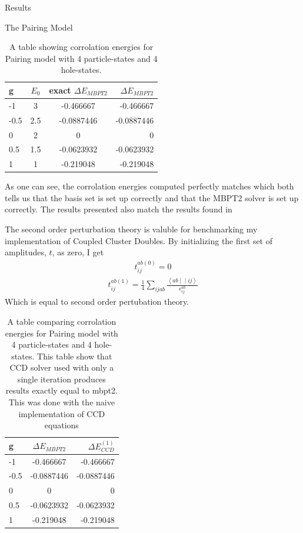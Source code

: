 \documentclass[twoside,english]{uiofysmaster}
\begin{document}
\begin{chapter}{Results}
\begin{section}{The Pairing Model}
		\begin{table}
			\begin{center}
				\begin{tabular}[center]{l | c | c | r}
					g & $E_0$ & exact $ \Delta E_{MBPT2}$  & $\Delta E_{MBPT2}$ \\
					\hline
					-1 & 3 & -0.466667 & -0.466667 \\
					-0.5 & 2.5 & -0.0887446 & -0.0887446 \\
					0 & 2 & 0 & 0 \\
					0.5 & 1.5 & -0.0623932 & -0.0623932 \\
					1 & 1 & -0.219048 & -0.219048
				\end{tabular}
			\end{center}
			\caption{A table showing corrolation energies for Pairing model with 4 particle-states and 4 hole-states.  }
			\label{Results1}
		\end{table}
		As one can see, the corrolation energies computed perfectly matches which both tells us that the basis set is set up correctly and that the MBPT2 solver is set up correctly. The results presented also match the results found in \cite{Hjorth-Jensen2016}

		The second order perturbation theory is valuble for benchmarking my implementation of Coupled Cluster Doubles. By initializing the first set of amplitudes, $t$, as zero, I get
		\begin{align}
			t_{ij}^{ab(0)} = 0  
		\end{align}
		\begin{align}
			t_{ij}^{ab(1)} = \frac{1}{4} \sum_{ijab} \frac{\left<ab\middle|\middle|ij\right>}{\epsilon_{ij}^{ab}} 
 		\end{align}
 		Which is equal to second order pertubation theory. 
 		\begin{table}
			\begin{center}
				\begin{tabular}[center]{l | c | r}
					g & $ \Delta E_{MBPT2}$  & $\Delta E_{CCD}^{(1)}$ \\
					\hline
					-1 & -0.466667 & -0.466667 \\
					-0.5 & -0.0887446 & -0.0887446 \\
					0 & 0 & 0 \\
					0.5 & -0.0623932 & -0.0623932 \\
					1 & -0.219048 & -0.219048
				\end{tabular}
			\end{center}
			\caption{A table comparing corrolation energies for Pairing model with 4 particle-states and 4 hole-states. This table show that CCD solver used with only a single iteration produces results exactly equal to mbpt2. This was done with the naive implementation of CCD equations}
			\label{Results2}
		\end{table}


\end{section}
\end{chapter}
\end{document}
